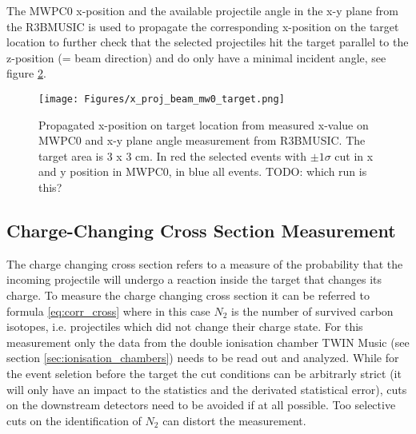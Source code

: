 \begin{enumerate}
\begin{figure}
\label{fig:mw0_cuts}
\end{figure}
The MWPC0 x-position and the available projectile angle in the x-y plane from the R3BMUSIC is used to propagate the corresponding x-position on the target location to further check that the selected projectiles hit the target parallel to the z-position (= beam direction) and do only have a minimal incident angle, see figure \ref{fig:x_pos_target}. 
\begin{figure}[htpb]
    \centering
    \texttt{[image: Figures/x\_proj\_beam\_mw0\_target.png]}
    \caption{
   	Propagated x-position on target location from measured x-value on MWPC0 and x-y plane angle measurement from R3BMUSIC. The target area is 3 x 3 cm. In red the selected events with $\pm 1\sigma$ cut in x and y position in MWPC0, in blue all events. TODO: which run is this?
    }
    \label{fig:x_pos_target}
\end{figure}
\end{enumerate}
\subsection{Charge-Changing Cross Section Measurement}
The charge changing cross section refers to a measure of the probability that the incoming projectile will undergo a reaction inside the target that changes its charge. To measure the charge changing cross section it can be referred to formula \ref{eq:corr_cross} where in this case $N_2$ is the number of survived carbon isotopes, i.e. projectiles which did not change their charge state. For this measurement only the data from the double ionisation chamber TWIN Music (see section \ref{sec:ionisation_chambers}) needs to be read out and analyzed.\newline
While for the event seletion before the target the cut conditions can be arbitrarly strict (it will only have an impact to the statistics and the derivated statistical error), cuts on the downstream detectors need to be avoided if at all possible. Too selective cuts on the identification of $N_2$ can distort the measurement.
